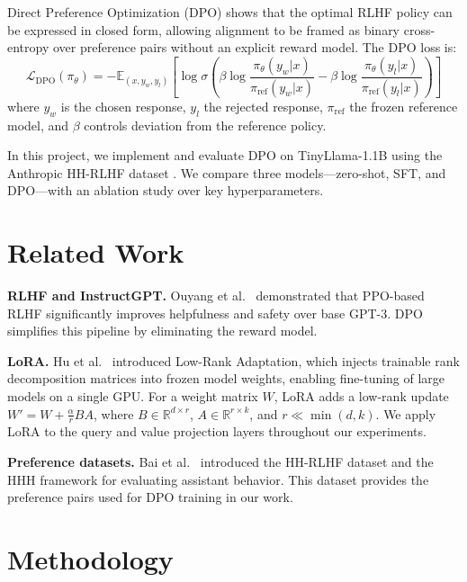 \documentclass{llncs}
\begin{document}
Direct Preference Optimization (DPO) \cite{rafailov2023} shows that the optimal RLHF
policy can be expressed in closed form, allowing alignment to be framed as binary
cross-entropy over preference pairs without an explicit reward model. The DPO loss is:
\begin{equation}
\mathcal{L}_\text{DPO}(\pi_\theta) = -\mathbb{E}_{(x,y_w,y_l)} \!\left[
    \log \sigma\!\left(
        \beta \log \frac{\pi_\theta(y_w|x)}{\pi_\text{ref}(y_w|x)}
        - \beta \log \frac{\pi_\theta(y_l|x)}{\pi_\text{ref}(y_l|x)}
    \right)
\right]
\end{equation}
where $y_w$ is the chosen response, $y_l$ the rejected response, $\pi_\text{ref}$ the
frozen reference model, and $\beta$ controls deviation from the reference policy.

In this project, we implement and evaluate DPO on TinyLlama-1.1B \cite{zhang2024tinyllama}
using the Anthropic HH-RLHF dataset \cite{bai2022}. We compare three models---zero-shot,
SFT, and DPO---with an ablation study over key hyperparameters.

\section{Related Work}

\textbf{RLHF and InstructGPT.} Ouyang et al.\ \cite{ouyang2022} demonstrated that
PPO-based RLHF significantly improves helpfulness and safety over base GPT-3. DPO
\cite{rafailov2023} simplifies this pipeline by eliminating the reward model.

\textbf{LoRA.} Hu et al.\ \cite{hu2021} introduced Low-Rank Adaptation, which injects
trainable rank decomposition matrices into frozen model weights, enabling fine-tuning of
large models on a single GPU. For a weight matrix $W$, LoRA adds a low-rank update
$W' = W + \frac{\alpha}{r}BA$, where $B \in \mathbb{R}^{d \times r}$,
$A \in \mathbb{R}^{r \times k}$, and $r \ll \min(d,k)$. We apply LoRA to the query
and value projection layers throughout our experiments.

\textbf{Preference datasets.} Bai et al.\ \cite{bai2022} introduced the HH-RLHF dataset
and the HHH framework for evaluating assistant behavior. This dataset provides the
preference pairs used for DPO training in our work.

\section{Methodology}
\end{document}
